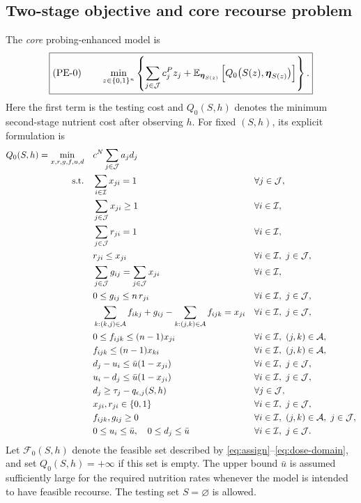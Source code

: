 \subsection{Two-stage objective and core recourse problem}
\label{subsec:core-model}

The \emph{core} probing-enhanced model is
\begin{equation}
\boxed{\displaystyle
 (\mathrm{PE}\text{-}0)\qquad
 \min_{z\in\{0,1\}^{n}}
 \left\{
   \sum_{j\in\mathcal{J}}c_j^P z_j
   +\mathbb{E}_{\boldsymbol{\eta}_{S(z)}}\left[
      Q_0\bigl(S(z),\boldsymbol{\eta}_{S(z)}\bigr)
    \right]
 \right\}.}
\label{eq:core-first-stage}
\end{equation}
Here the first term is the testing cost and $Q_0(S,h)$ denotes the
minimum second-stage nutrient cost after observing $h$. For fixed $(S,h)$,
its explicit formulation is
\allowdisplaybreaks
\begin{align}
Q_0(S,h)=\min_{x,r,g,f,u,d}\quad
 &c^N\sum_{j\in\mathcal{J}}a_jd_j
 &&\label{eq:recourse-objective}\\
\text{s.t.}\quad
 &\sum_{i\in\mathcal{I}}x_{ji}=1
 &&\forall j\in\mathcal{J},\label{eq:assign}\\
 &\sum_{j\in\mathcal{J}}x_{ji}\geq1
 &&\forall i\in\mathcal{I},\label{eq:nonempty}\\
 &\sum_{j\in\mathcal{J}}r_{ji}=1
 &&\forall i\in\mathcal{I},\label{eq:one-root}\\
 &r_{ji}\leq x_{ji}
 &&\forall i\in\mathcal{I},\ j\in\mathcal{J},\label{eq:root-located}\\
 &\sum_{j\in\mathcal{J}}g_{ij}=\sum_{j\in\mathcal{J}}x_{ji}
 &&\forall i\in\mathcal{I},\label{eq:source-balance}\\
 &0\leq g_{ij}\leq n\,r_{ji}
 &&\forall i\in\mathcal{I},\ j\in\mathcal{J},\label{eq:source-capacity}\\
 &\sum_{k:(k,j)\in\mathcal{A}}f_{ikj}+g_{ij}
       -\sum_{k:(j,k)\in\mathcal{A}}f_{ijk}=x_{ji}
 &&\forall i\in\mathcal{I},\ j\in\mathcal{J},\label{eq:flow-balance}\\
 &0\leq f_{ijk}\leq(n-1)x_{ji}
 &&\forall i\in\mathcal{I},\ (j,k)\in\mathcal{A},\label{eq:flow-tail}\\
 &f_{ijk}\leq(n-1)x_{ki}
 &&\forall i\in\mathcal{I},\ (j,k)\in\mathcal{A},\label{eq:flow-head}\\
 &d_j-u_i\leq\bar u(1-x_{ji})
 &&\forall i\in\mathcal{I},\ j\in\mathcal{J},\label{eq:dose-link-1}\\
 &u_i-d_j\leq\bar u(1-x_{ji})
 &&\forall i\in\mathcal{I},\ j\in\mathcal{J},\label{eq:dose-link-2}\\
 &d_j\geq\tau_j-q_{\epsilon,j}(S,h)
 &&\forall j\in\mathcal{J},\label{eq:nutrition}\\
 &x_{ji},r_{ji}\in\{0,1\}
 &&\forall i\in\mathcal{I},\ j\in\mathcal{J},\label{eq:binary-domain}\\
 &f_{ijk},g_{ij}\geq0
 &&\forall i\in\mathcal{I},\ (j,k)\in\mathcal{A},\ j\in\mathcal{J},\label{eq:flow-domain}\\
 &0\leq u_i\leq\bar u,\quad0\leq d_j\leq\bar u
 &&\forall i\in\mathcal{I},\ j\in\mathcal{J}.\label{eq:dose-domain}
\end{align}
Let $\mathcal F_0(S,h)$ denote the feasible set described by
\eqref{eq:assign}--\eqref{eq:dose-domain}, and set $Q_0(S,h)=+\infty$
if this set is empty. The upper bound $\bar u$ is assumed sufficiently
large for the required nutrition rates whenever the model is intended
to have feasible recourse. The testing set $S=\varnothing$ is allowed.

